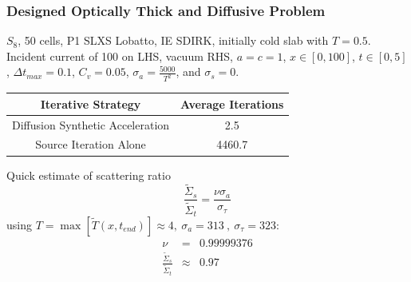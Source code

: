 \documentclass{beamer}
\newcommand{\be}{\begin{equation*}}   %
\newcommand{\ee}{\end{equation*}}
\newcommand{\bea}{\begin{eqnarray*}}  %
\newcommand{\eea}{\end{eqnarray*}}
\begin{document}

\begin{frame}
\frametitle{Designed Optically Thick and Diffusive Problem}
$S_8$, 50 cells, P1 SLXS Lobatto, IE SDIRK, initially cold slab with $T=0.5$.
Incident current of 100 on LHS, vacuum RHS, $a=c=1$, $x\in[0,100]$, $t\in[0,5]$, $\Delta t_{max} = 0.1$, $C_v =0.05$, $\sigma_a =\frac{5000}{T^2}$, and $\sigma_s = 0$. 
\begin{center}
\footnotesize
\begin{tabular}{|c|c|}
\hline	
Iterative Strategy		& Average Iterations  \\
\hline
Diffusion Synthetic Acceleration				&   2.5  \\ 
\hline
Source Iteration Alone  &   4460.7 \\
\hline
\end{tabular}
%
\end{center}
Quick estimate of scattering ratio
\be
\frac{\widetilde{\Sigma}_s}{\widetilde{\Sigma}_t} = \frac{\nu \sigma_a }{\sigma_{\tau}}
\ee
using $T = \max\left[\widetilde{T}(x,t_{end})\right]\approx 4, ~\sigma_a = 313~,~\sigma_{\tau} = 323$:
\bea 
\nu &=& 0.99999376 \\
\frac{\widetilde{\Sigma}_s}{\widetilde{\Sigma}_t} &\approx& 0.97
\eea

\end{frame}
\end{document}
